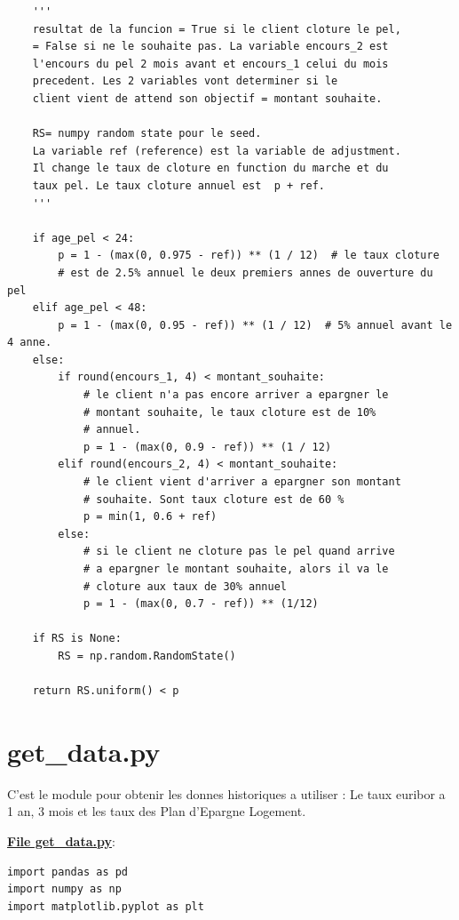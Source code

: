 \documentclass[12pt, a4paper]{book}
\begin{document}
{\begin{small}
\begin{verbatim}
    '''
    resultat de la funcion = True si le client cloture le pel,
    = False si ne le souhaite pas. La variable encours_2 est
    l'encours du pel 2 mois avant et encours_1 celui du mois
    precedent. Les 2 variables vont determiner si le
    client vient de attend son objectif = montant souhaite.
    
    RS= numpy random state pour le seed.
    La variable ref (reference) est la variable de adjustment.
    Il change le taux de cloture en function du marche et du
    taux pel. Le taux cloture annuel est  p + ref.
    '''

    if age_pel < 24:
        p = 1 - (max(0, 0.975 - ref)) ** (1 / 12)  # le taux cloture
        # est de 2.5% annuel le deux premiers annes de ouverture du pel
    elif age_pel < 48:
        p = 1 - (max(0, 0.95 - ref)) ** (1 / 12)  # 5% annuel avant le 4 anne.
    else:
        if round(encours_1, 4) < montant_souhaite:
            # le client n'a pas encore arriver a epargner le
            # montant souhaite, le taux cloture est de 10%
            # annuel.
            p = 1 - (max(0, 0.9 - ref)) ** (1 / 12)
        elif round(encours_2, 4) < montant_souhaite:
            # le client vient d'arriver a epargner son montant
            # souhaite. Sont taux cloture est de 60 %
            p = min(1, 0.6 + ref)
        else:
            # si le client ne cloture pas le pel quand arrive
            # a epargner le montant souhaite, alors il va le
            # cloture aux taux de 30% annuel
            p = 1 - (max(0, 0.7 - ref)) ** (1/12)

    if RS is None:
        RS = np.random.RandomState()

    return RS.uniform() < p

\end{verbatim}
\end{small}


\section{get\_data.py}
\label{get_data.py}

C'est le module pour obtenir les donnes historiques a utiliser : Le taux euribor a 1 an, 3 mois et les taux des Plan d'Epargne Logement.

\medskip

{\bf \underline{File get\_data.py}}:
\begin{small}
\begin{verbatim}
import pandas as pd
import numpy as np
import matplotlib.pyplot as plt



\end{verbatim}
\end{small}}
\end{document}
